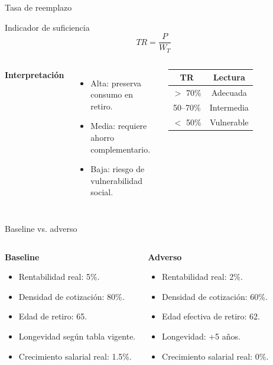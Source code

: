 \documentclass[aspectratio=169,11pt]{beamer}
\newcommand{\baseline}{\textbf{\color{macrogreen}Baseline}}
\newcommand{\adverso}{\textbf{\color{macrored}Adverso}}
\begin{document}
\begin{frame}{Tasa de reemplazo}
\begin{block}{Indicador de suficiencia}
\[
TR = \frac{P}{W_T}
\]
\end{block}

\begin{columns}
\textbf{Interpretación}
\begin{itemize}
  \item Alta: preserva consumo en retiro.
  \item Media: requiere ahorro complementario.
  \item Baja: riesgo de vulnerabilidad social.
\end{itemize}

\begin{table}
\centering
\begin{tabular}{cc}
\toprule
TR & Lectura \\
\midrule
$>$ 70\% & Adecuada \\
50--70\% & Intermedia \\
$<$ 50\% & Vulnerable \\
\bottomrule
\end{tabular}
\end{table}
\end{columns}
\end{frame}

\begin{frame}{Baseline vs. adverso}
\begin{columns}
\begin{block}{\baseline}
\begin{itemize}
  \item Rentabilidad real: 5\%.
  \item Densidad de cotización: 80\%.
  \item Edad de retiro: 65.
  \item Longevidad según tabla vigente.
  \item Crecimiento salarial real: 1.5\%.
\end{itemize}
\end{block}

\begin{alertblock}{\adverso}
\begin{itemize}
  \item Rentabilidad real: 2\%.
  \item Densidad de cotización: 60\%.
  \item Edad efectiva de retiro: 62.
  \item Longevidad: +5 años.
  \item Crecimiento salarial real: 0\%.
\end{itemize}
\end{alertblock}
\end{columns}
\end{frame}
\end{document}
